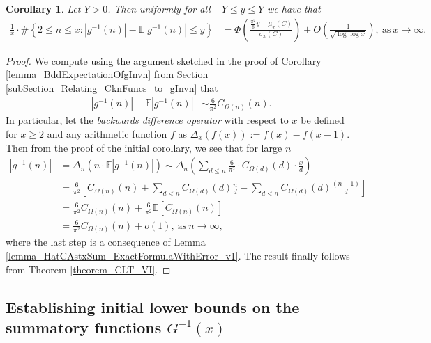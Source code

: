 \documentclass[11pt,reqno,a4letter]{article}
\numberwithin{figure}{section}
\numberwithin{table}{section}
\theoremstyle{plain}
\newtheorem{cor}[theorem]{Corollary}
\numberwithin{theorem}{section}
\theoremstyle{definition}
\begin{document}
\begin{cor} 
\label{cor_CLT_VII} 
Let $Y > 0$. 
Then uniformly for all $-Y \leq y \leq Y$ 
we have that 
\begin{align*} 
\frac{1}{x} \cdot \#\left\{2 \leq n \leq x:|g^{-1}(n)| - 
     \mathbb{E}|g^{-1}(n)| \leq y\right\} & = 
     \Phi\left(\frac{\frac{\pi^2}{6} y - \mu_x(C)}{\sigma_x(C)}\right) + 
     O\left(\frac{1}{\sqrt{\log\log x}}\right), 
     \mathrm{\ as\ } x \rightarrow \infty. 
\end{align*} 
\end{cor} 
\begin{proof} 
We compute using the argument sketched in the proof of 
Corollary \ref{lemma_BddExpectationOfgInvn} from 
Section \ref{subSection_Relating_CknFuncs_to_gInvn} that 
\begin{align*} 
|g^{-1}(n)| - \mathbb{E}|g^{-1}(n)| & \sim \frac{6}{\pi^2} C_{\Omega(n)}(n). 
\end{align*} 
In particular, let the \emph{backwards difference operator} with respect to $x$ 
be defined for $x \geq 2$ and any arithmetic function $f$ as 
$\Delta_x(f(x)) := f(x) - f(x-1)$. Then from the proof of the initial corollary, 
we see that for large $n$ 
\begin{align*} 
|g^{-1}(n)| & = \Delta_n(n \cdot \mathbb{E}|g^{-1}(n)|) 
     \sim \Delta_n\left(\sum_{d \leq n} \frac{6}{\pi^2} \cdot C_{\Omega(d)}(d) \cdot \frac{x}{d}\right) \\ 
     & = \frac{6}{\pi^2}\left[C_{\Omega(n)}(n) + \sum_{d < n} C_{\Omega(d)}(d) \frac{n}{d} - 
     \sum_{d<n} C_{\Omega(d)}(d) \frac{(n-1)}{d}\right] \\ 
     & = \frac{6}{\pi^2} C_{\Omega(n)}(n) + \frac{6}{\pi^2} \mathbb{E}[C_{\Omega(n)}(n)] \\ 
     & = \frac{6}{\pi^2} C_{\Omega(n)}(n) + o(1), 
     \mathrm{\ as\ } n \rightarrow \infty, 
\end{align*} 
where the last step is a consequence of 
Lemma \ref{lemma_HatCAstxSum_ExactFormulaWithError_v1}. 
The result finally follows from Theorem \ref{theorem_CLT_VI}. 
\end{proof} 

\subsection{Establishing initial lower bounds on the summatory functions $G^{-1}(x)$} 
\label{Section_ProofOfValidityOfAverageOrderLowerBounds} 
\end{document}
